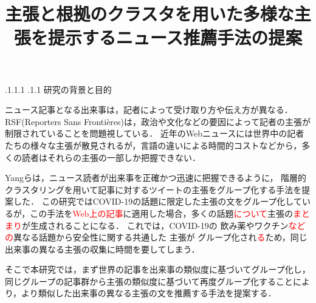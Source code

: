 \documentclass[a4paper, twocolumn, 10pt]{jarticle}
\makeatletter
\def\section{%
	\@startsection{section}{1}{\z@}%
	{.1\Cvs \@plus.1\Cdp \@minus.1\Cdp}%
	{.1\Cvs \@plus.1\Cdp}%
	{\normalfont\normalsize\bfseries}%
}
\makeatother
\begin{document}
\title{主張と根拠のクラスタを用いた多様な主張を提示するニュース推薦手法の提案}

\maketitle

\thispagestyle{empty}

\section{研究の背景と目的}

ニュース記事となる出来事は，記者によって受け取り方や伝え方が異なる．
RSF(Reporters Sans Frontières)は，政治や文化などの要因によって記者の主張が制限されていることを問題視している\cite{2021_world_press_freedom_index}．
近年のWebニュースには世界中の記者たちの様々な主張が散見されるが，言語の違いによる時間的コストなどから，多くの読者はそれらの主張の一部しか把握できない．

Yangらは，ニュース読者が出来事を正確かつ迅速に把握できるように，
階層的クラスタリングを用いて記事に対するツイートの主張をグループ化する手法を提案した\cite{yang_scalable_2021}．
この研究ではCOVID-19の話題に限定した主張の文をグループ化しているが，この手法を\textcolor{red}{Web上の記事}に適用した場合，多くの話題\textcolor{red}{について}主張の\textcolor{red}{まとまり}が生成されることになる．
これでは，COVID-19の
飲み薬やワクチン\textcolor{red}{などの}異なる話題から安全性に関する共通した
主張が
グループ化され\textcolor{red}{る}ため，同じ出来事の異なる主張の収集に時間を要してしまう．






そこで本研究では，まず世界の記事を出来事の類似度に基づいてグループ化し，同じグループの記事群から主張の類似度に基づいて再度グループ化することにより，より類似した出来事の異なる主張の文を推薦する手法を提案する．
\end{document}
